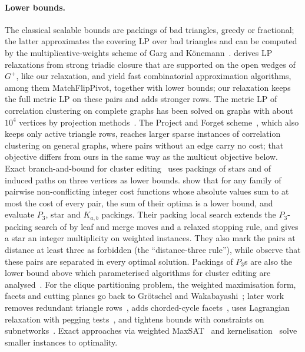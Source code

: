 \paragraph{Lower bounds.}  The classical scalable bounds are packings of bad
triangles, greedy or fractional; the latter approximates the covering LP over
bad triangles and can be computed by the multiplicative-weights scheme of
Garg and K\"onemann~\cite{GargK07,Fleischer00}.  \citet{veldt2022stc} derives
LP relaxations from strong triadic closure that are supported on the open
wedges of $G^+$, like our relaxation, and yield fast combinatorial
approximation algorithms, among them MatchFlipPivot, together with lower
bounds; our relaxation keeps the full metric LP
on these pairs and adds stronger rows.  The metric LP of correlation clustering on complete graphs has been solved
on graphs with about $10^4$ vertices by projection
methods~\cite{veldt2019metric,ruggles2020parallel}.  The Project and Forget
scheme~\cite{SonthaliaG22project}, which also keeps only active triangle
rows, reaches larger sparse instances of correlation clustering on general
graphs, where pairs without an edge carry no cost; that objective differs
from ours in the same way as the multicut objective below.  Exact branch-and-bound for cluster
editing~\cite{BockerBK11exact,BlasiusEtAl22sea,BlasiusEtAl21kapoceExact} uses
packings of stars and of induced paths on three vertices as lower bounds.
\citet[Theorem~1]{BlasiusEtAl22sea} show that for any family of pairwise
non-conflicting integer cost functions whose absolute values sum to at most
the cost of every pair, the sum of their optima is a lower bound, and evaluate
$P_3$, star and $K_{a,b}$ packings.  Their packing local search extends the
$P_3$-packing search of \citet{GottesburenHSSWZ20} by leaf and merge moves
and a relaxed stopping rule, and gives a star an integer multiplicity on
weighted instances.  They also mark the pairs at distance at
least three as forbidden (the ``distance-three rule''), while
\citet{BastosOPSMP16} observe that these pairs are separated in every optimal
solution.  Packings of $P_3$s are also the lower bound above which
parameterised algorithms for cluster editing are
analysed~\cite{vanBevernFK18,LiPS21}.  For the clique
partitioning problem, the weighted maximisation form, facets and cutting
planes go back to Gr\"otschel and Wakabayashi~\cite{GrotschelW89,
GrotschelW90facets}; later work removes redundant triangle
rows~\cite{MiyauchiS15redundant,miyauchi2018exact,koshimura2022concise}, adds
chorded-cycle facets~\cite{irmai2024chorded}, uses Lagrangian relaxation with
pegging tests~\cite{SukegawaYZ13lagrangian}, and tightens bounds with
constraints on subnetworks~\cite{belyi2023subnetwork}.  Exact approaches via
weighted MaxSAT~\cite{BergJ17maxsat} and kernelisation~\cite{Guo09kernel,
CaoC12kernel} solve smaller instances to optimality.

